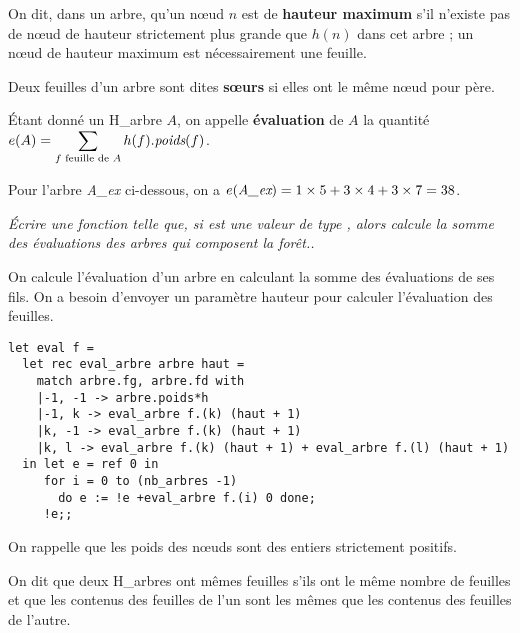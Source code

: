 On dit, dans un arbre, qu’un nœud $n$ est de {\bf hauteur maximum} s’il n’existe pas de nœud de hauteur
strictement plus grande que $h(n)$ dans cet arbre ; un nœud de hauteur maximum est nécessairement une feuille.

Deux feuilles d’un arbre sont dites {\bf sœurs} si elles ont le même nœud pour père.

Étant donné un H\_arbre $A$, on appelle {\bf évaluation} de $A$ la quantité $\displaystyle e(A) = \sum_{f \text{ feuille de }A}
h(f).\text{\it poids}(f)$.

Pour l'arbre {\it A\_ex} ci-dessous, on a $e(\text{\it A\_ex}) = 1\times 5 + 3 \times 4 + 3 \times 7 = 38$.
\begin{Exercise}\it
Écrire une fonction  telle que, si  est une valeur de type , alors  calcule la somme des évaluations des arbres qui composent la forêt..
\end{Exercise}
\begin{Answer}

On calcule l'évaluation d'un arbre en calculant la somme des évaluations de ses fils. On a besoin d'envoyer un paramètre hauteur pour calculer l'évaluation des feuilles.
\begin{lstlisting}
let eval f =
  let rec eval_arbre arbre haut =
    match arbre.fg, arbre.fd with 
    |-1, -1 -> arbre.poids*h
    |-1, k -> eval_arbre f.(k) (haut + 1)
    |k, -1 -> eval_arbre f.(k) (haut + 1)
    |k, l -> eval_arbre f.(k) (haut + 1) + eval_arbre f.(l) (haut + 1)
  in let e = ref 0 in
     for i = 0 to (nb_arbres -1) 
       do e := !e +eval_arbre f.(i) 0 done;
     !e;;
\end{lstlisting}
\end{Answer}
\medskip

On rappelle que les poids des nœuds sont des entiers strictement positifs.

On dit que deux H\_arbres ont mêmes feuilles s’ils ont le même nombre de feuilles et que les contenus des
feuilles de l’un sont les mêmes que les contenus des feuilles de l’autre. 

